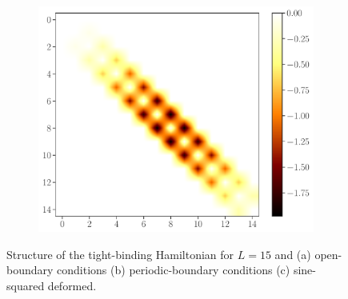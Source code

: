 \documentclass[11pt, a4paper]{article}
\theoremstyle{definition} %
\begin{document}
\begin{figure}[h]
\begin{subfigure}[b]{0.31\textwidth}
			\includegraphics[width = \textwidth]{ColorMapMatrix_SSD}	
			\caption{}
		\end{subfigure}
		\caption{Structure of the tight-binding Hamiltonian for $L = 15$ and (a) open-boundary conditions (b) periodic-boundary conditions (c) sine-squared deformed.}
\end{figure}





\end{document}

